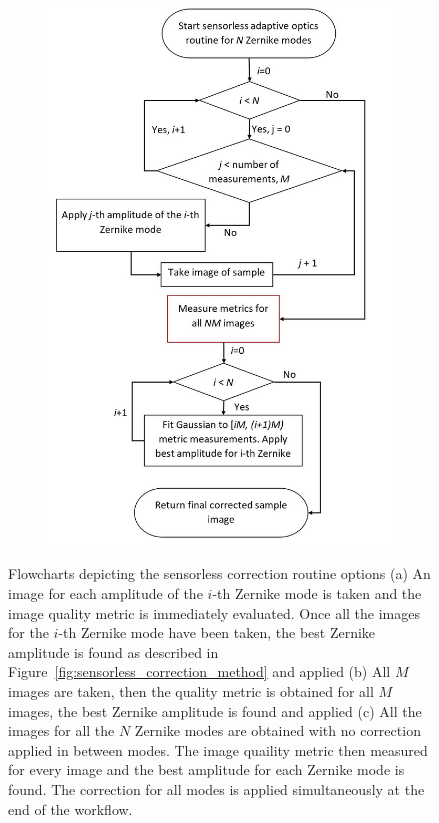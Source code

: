 \begin{figure}[h]
	\centering
	\begin{subfigure}{0.425\textwidth}
		\includegraphics[scale=0.55]{./images/sensorless_correction_workflow_3.jpg}
		\caption{}
		\label{fig:sensorless_correction_workflow_3}
	\end{subfigure}
	\caption{Flowcharts depicting the sensorless correction routine options (a) An image for each amplitude of the $i$-th Zernike mode is taken and the image quality metric is immediately evaluated. Once all the images for the $i$-th Zernike mode have been taken, the best Zernike amplitude is found as described in Figure~\ref{fig:sensorless_correction_method} and applied (b) All $M$ images are taken, then the quality metric is obtained for all $M$ images, the best Zernike amplitude is found and applied (c) All the images for all the $N$ Zernike modes are obtained with no correction applied in between modes. The image quaility metric then measured for every image and the best amplitude for each Zernike mode is found. The correction for all modes is applied simultaneously at the end of the workflow.}
	\label{fig:sensorless_correction_workflows}
\end{figure}